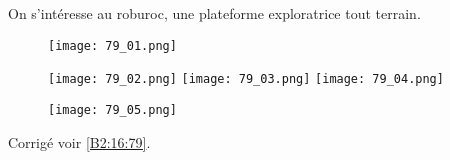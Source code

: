 \normaltrue \difficilefalse \tdifficilefalse
\correctionfalse

\setcounter{question}{0}


\ifcorrection
\else
{}
\fi


\ifprof
\else
On s'intéresse au roburoc, une plateforme exploratrice tout terrain.

\begin{figure}[H]
\centering
\texttt{[image: 79\_01.png]}
\end{figure} 

\begin{figure}[H]
\centering
\texttt{[image: 79\_02.png]}
\texttt{[image: 79\_03.png]}
\texttt{[image: 79\_04.png]}
\end{figure} 


\begin{figure}[H]
\centering
\texttt{[image: 79\_05.png]}
\end{figure} 
\fi




 

\ifprof
\else


\begin{flushright}
\footnotesize{Corrigé  voir \ref{B2:16:79}.}
\end{flushright}%
\fi